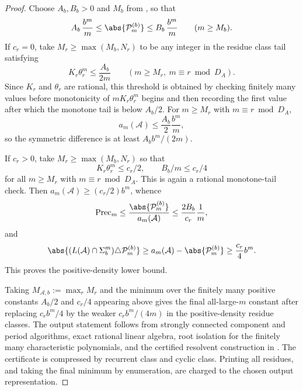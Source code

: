 \begin{proof}
  Choose \(A_b,B_b>0\) and \(M_b\) from
  , so that
  \[
    A_b\,\frac{b^m}{m}
    \le\abs{\mathcal P_m^{(b)}}
    \le B_b\,\frac{b^m}{m}
    \qquad(m\ge M_b).
  \]
  If \(c_r=0\), take \(M_r\ge \max(M_b,N_r)\) to be any integer in the
  residue class tail satisfying
  \[
    K_r\theta_r^m\le \frac{A_b}{2m}
    \qquad(m\ge M_r,\ m\equiv r\bmod {D_A}).
  \]
  Since \(K_r\) and \(\theta_r\) are rational, this threshold is
  obtained by checking finitely many values before monotonicity of
  \(mK_r\theta_r^m\) begins and then recording the first value after
  which the monotone tail is below \(A_b/2\).
  For \(m\ge M_r\) with \(m\equiv r\bmod {D_A}\),
  \[
    a_m(\mathcal A)\le \frac{A_b}{2}\frac{b^m}{m},
  \]
  so the symmetric difference is at least
  \(A_b b^m/(2m)\).

  If \(c_r>0\), take \(M_r\ge \max(M_b,N_r)\) so that
  \[
    K_r\theta_r^m\le c_r/2,
    \qquad
    B_b/m\le c_r/4
  \]
  for all \(m\ge M_r\) with \(m\equiv r\bmod {D_A}\). This is again a
  rational monotone-tail check.
  Then \(a_m(\mathcal A)\ge(c_r/2)b^m\), whence
  \[
    \mathrm{Prec}_m
    \le\frac{\abs{\mathcal P_m^{(b)}}}{a_m(\mathcal A)}
    \le\frac{2B_b}{c_r}\frac1m,
  \]
  and
  \[
    \abs{(L(\mathcal A)\cap\Sigma_b^m)\triangle\mathcal P_m^{(b)}}
    \ge a_m(\mathcal A)-\abs{\mathcal P_m^{(b)}}
    \ge \frac{c_r}{4}b^m.
  \]
  This proves the positive-density lower bound.

  Taking
  \(M_{\mathcal A,b}:=\max_r M_r\) and the minimum over the finitely many
  positive constants \(A_b/2\) and \(c_r/4\) appearing above gives the
  final all-large-\(m\) constant after replacing \(c_r b^m/4\) by the
  weaker \(c_r b^m/(4m)\) in the positive-density residue classes.
  The output statement follows from strongly connected component and
  period algorithms, exact rational linear algebra, root isolation for
  the finitely many characteristic polynomials, and the certified
  resolvent construction in .
  The certificate is compressed by recurrent class and cyclic class.
  Printing all residues, and taking the final minimum by enumeration,
  are charged to the chosen output representation.
\end{proof}


